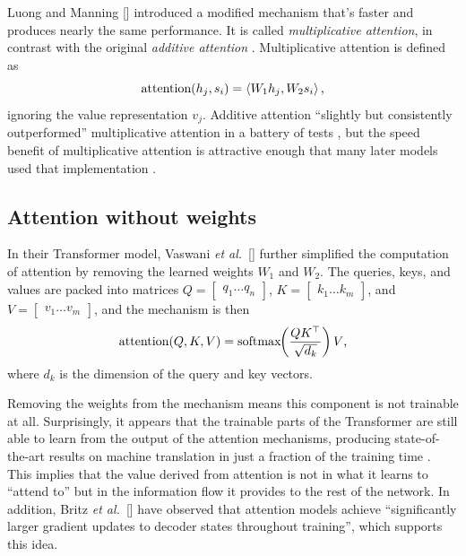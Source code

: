 \documentclass{article}
\newcommand{\etal}{\textit{et al.}}
\begin{document}
Luong and Manning [\citeyear{multiplicative_attn}] introduced a modified mechanism that's faster and produces nearly the same performance. It is called \textit{multiplicative attention}, in contrast with the original \textit{additive attention} \cite{massive_exploration}. Multiplicative attention is defined as
\[
\text{attention}(h_j,s_i)=\left<W_1h_j,W_2s_i\right>\text,
\]
ignoring the value representation $v_j$. Additive attention ``slightly but consistently outperformed'' multiplicative attention in a battery of tests \cite{massive_exploration}, but the speed benefit of multiplicative attention is attractive enough that many later models used that implementation \cite{attn_all_you_need,more_multiplicative}.

\subsection{Attention without weights}

In their Transformer model, Vaswani \etal~[\citeyear{attn_all_you_need}] further simplified the computation of attention by removing the learned weights $W_1$ and $W_2$. The queries, keys, and values are packed into matrices $Q=\begin{bmatrix} q_1 \hdots q_n \end{bmatrix}$, $K=\begin{bmatrix} k_1 \hdots k_m \end{bmatrix}$, and $V=\begin{bmatrix} v_1 \hdots v_m \end{bmatrix}$, and the mechanism is then
\[
\text{attention}(Q,K,V)=\text{softmax}\hspace{-0.6ex}\left(\frac{QK^\top}{\sqrt{d_k}}\right)V\text,
\]
where $d_k$ is the dimension of the query and key vectors.

Removing the weights from the mechanism means this component is not trainable at all. Surprisingly, it appears that the trainable parts of the Transformer are still able to learn from the output of the attention mechanisms, producing state-of-the-art results on machine translation in just a fraction of the training time \cite{attn_all_you_need}. This implies that the value derived from attention is not in what it learns to ``attend to'' but in the information flow it provides to the rest of the network. In addition, Britz \etal~[\citeyear{massive_exploration}] have observed that attention models achieve ``significantly larger gradient updates to decoder states throughout training'', which supports this idea.
\end{document}
